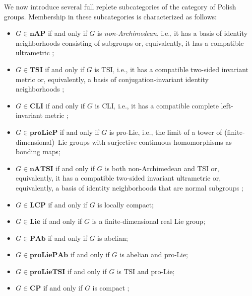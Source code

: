 \documentclass[12pt]{amsart}
\theoremstyle{definition}
\begin{document}
We now introduce several full replete subcategories of the category of
Polish groups. Membership in these subcategories is characterized as follows:

\begin{itemize}
\item $G\in\mathbf{nAP}$ if and only if $G$ is \emph{non-Archimedean}, i.e.,
it has a basis of identity neighborhoods consisting of subgroups \cite[%
Section~2.4]{gao_invariant_2009} or, equivalently, it has a compatible
ultrametric \cite[Theorem~2.4.1]{gao_invariant_2009};

\item $G\in\mathbf{TSI}$ if and only if $G$ is TSI, i.e., it has a
compatible two-sided invariant metric or, equivalently, a basis of
conjugation-invariant identity neighborhoods \cite{allison_dynamical_2021};

\item $G\in\mathbf{CLI}$ if and only if $G$ is CLI, i.e., it has a
compatible complete left-invariant metric \cite%
{lupini_games_2018,allison_class_2024};

\item $G\in\mathbf{proLieP}$ if and only if $G$ is pro-Lie, i.e., the limit
of a tower of (finite-dimensional)\ Lie groups with surjective continuous
homomorphisms as bonding maps;

\item $G\in\mathbf{nATSI}$ if and only if $G$ is both non-Archimedean and
TSI or, equivalently, it has a compatible two-sided invariant ultrametric
or, equivalently, a basis of identity neighborhoods that are normal
subgroups \cite[Corollary~2.5]{gao_non-archimedean_2014};

\item $G\in\mathbf{LCP}$ if and only if $G$ is locally compact;

\item $G\in\mathbf{Lie}$ if and only if $G$ is a finite-dimensional real Lie
group;

\item $G\in\mathbf{PAb}$ if and only if $G$ is abelian;

\item $G\in\mathbf{proLiePAb}$ if and only if $G$ is abelian and pro-Lie;

\item $G\in\mathbf{proLieTSI}$ if and only if $G$ is TSI and pro-Lie;

\item $G\in\mathbf{CP}$ if and only if $G$ is compact \cite%
{hofmann_structure_2013};


\end{itemize}
\end{document}
